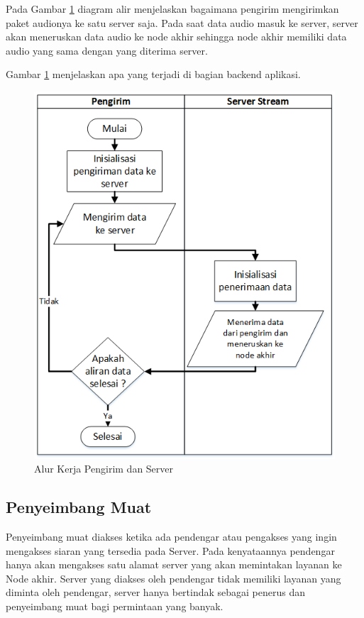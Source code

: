 Pada Gambar \ref{fig:kirim-server} diagram alir menjelaskan bagaimana pengirim mengirimkan paket audionya ke satu server saja. Pada saat data audio masuk ke server, server akan meneruskan data audio ke node akhir sehingga node akhir memiliki data audio yang sama dengan yang diterima server.

Gambar \ref{fig:kirim-server} menjelaskan apa yang terjadi di bagian backend aplikasi.

\begin{figure}
    \centering
    \includegraphics[width=0.7\linewidth]{kirim-server}
    \caption{Alur Kerja Pengirim dan Server}
    \label{fig:kirim-server}
\end{figure}


\subsection{Penyeimbang Muat}
Penyeimbang muat diakses ketika ada pendengar atau pengakses yang ingin mengakses siaran yang tersedia pada Server. Pada kenyataannya pendengar hanya akan mengakses satu alamat server yang akan memintakan layanan ke Node akhir. Server yang diakses oleh pendengar tidak memiliki layanan yang diminta oleh pendengar, server hanya bertindak sebagai penerus dan penyeimbang muat bagi permintaan yang banyak.

